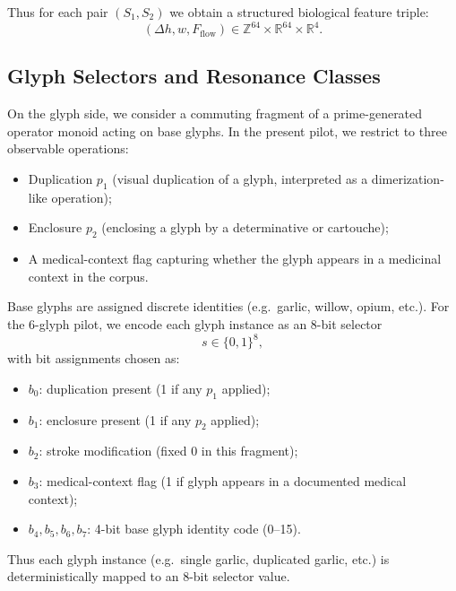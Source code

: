 \documentclass[11pt]{article}
\begin{document}
Thus for each pair $(S_1,S_2)$ we obtain a structured biological feature triple:
\begin{equation}
 (\Delta h, w, F_{\text{flow}}) \in \mathbb{Z}^{64} \times \mathbb{R}^{64} \times \mathbb{R}^4.
\end{equation}

\subsection{Glyph Selectors and Resonance Classes}

On the glyph side, we consider a commuting fragment of a prime-generated operator monoid acting on base glyphs. In the present pilot, we restrict to three observable operations:
\begin{itemize}
  \item Duplication $p_1$ (visual duplication of a glyph, interpreted as a dimerization-like operation);
  \item Enclosure $p_2$ (enclosing a glyph by a determinative or cartouche);
  \item A medical-context flag capturing whether the glyph appears in a medicinal context in the corpus.\cite{glyphengine}
\end{itemize}
Base glyphs are assigned discrete identities (e.g.\ garlic, willow, opium, etc.). For the 6-glyph pilot, we encode each glyph instance as an 8-bit selector
\begin{equation}
 s \in \{0,1\}^8,
\end{equation}
with bit assignments chosen as:
\begin{itemize}
  \item $b_0$: duplication present (1 if any $p_1$ applied);
  \item $b_1$: enclosure present (1 if any $p_2$ applied);
  \item $b_2$: stroke modification (fixed 0 in this fragment);
  \item $b_3$: medical-context flag (1 if glyph appears in a documented medical context);
  \item $b_4,b_5,b_6,b_7$: 4-bit base glyph identity code (0--15).
\end{itemize}
Thus each glyph instance (e.g.\ single garlic, duplicated garlic, etc.) is deterministically mapped to an 8-bit selector value.
\end{document}
